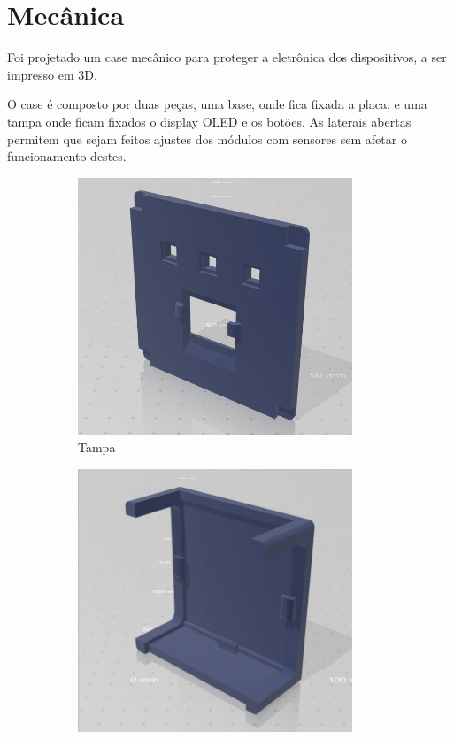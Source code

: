 \documentclass[../monografia.tex]{subfiles}
\begin{document}
\section{Mecânica}

Foi projetado um case mecânico para proteger a eletrônica dos dispositivos, a ser impresso em 3D. 

O case é composto por duas peças, uma base, onde fica fixada a placa, e uma tampa onde ficam fixados o display OLED e os botões. As laterais abertas permitem que sejam feitos ajustes dos módulos com sensores sem afetar o funcionamento destes. 

\begin{figure}[h]
\centering
	\begin{subfigure}{0.5\textwidth}
		\centering
		\includegraphics[width=0.9\textwidth]{mec-tampa.jpeg}
		\caption{Tampa}
		\label{fig:tampa-mec}
	\end{subfigure}%
	\begin{subfigure}{0.5\textwidth}
		\centering
		\includegraphics[width=0.9\textwidth]{mec-base.jpeg}

\end{subfigure}
\end{figure}
\end{document}
